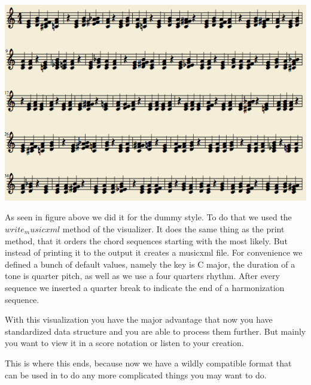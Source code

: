 \includegraphics[scale=.5]{Chapters/pic/xml_print.png}

As seen in figure above we did it for the dummy style. To do that we used the $write_musicxml$ method of the visualizer. It does the same thing as the print method, that it orders the chord sequences starting with the most likely. But instead of printing it to the output it creates a musicxml file. For convenience we defined a bunch of default values, namely the key is C major, the duration of a tone is quarter pitch, as well as we use a four quarters rhythm. After every sequence we inserted a quarter break to indicate the end of a harmonization sequence.

With this visualization you have the major advantage that now you have standardized data structure and you are able to process them further. But mainly you want to view it in a score notation or listen to your creation.

This is where this ends, because now we have a wildly compatible format that can be used in to do any more complicated things you may want to do. 